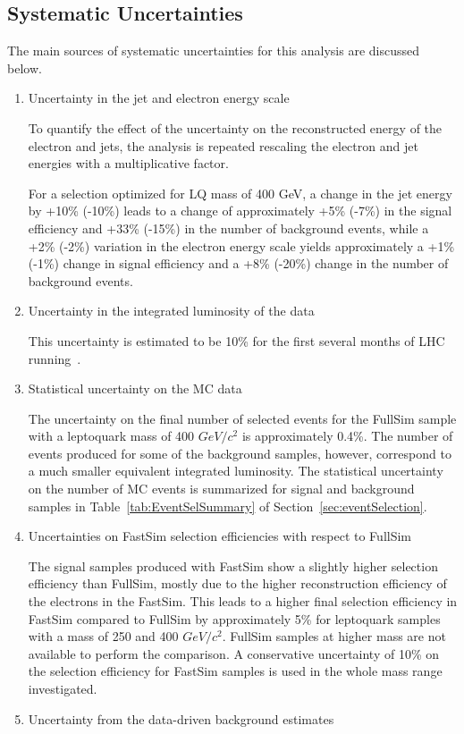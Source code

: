 \documentclass{cmspaper}
\begin{document}
\begin{linenumbers}
\section{Systematic Uncertainties} \label{sec:Systematics}

The main sources of systematic uncertainties for this analysis are discussed below.

%
\begin{enumerate}
\item Uncertainty in the jet and electron energy scale

To quantify the effect of the uncertainty on the reconstructed energy of the electron and jets,
the analysis is repeated rescaling the electron and jet energies
 with a multiplicative factor. 

For a selection optimized for LQ mass of 400 GeV, a change in the jet energy by +10\% (-10\%) leads 
to a change of approximately +5\% (-7\%) in the signal efficiency and +33\% (-15\%) in the number of background events, 
while a +2\% (-2\%) variation in the electron energy scale yields approximately a +1\% (-1\%) 
change in signal efficiency and a +8\% (-20\%) change in the number of background events. 

%
\item Uncertainty in the integrated luminosity of the data

This uncertainty is estimated to be 10\% for the first several months of LHC running~\cite{PTDR}. 
%
\item Statistical uncertainty on the MC data

The uncertainty on the final number of selected events for the FullSim sample with a leptoquark mass of 400 $GeV/c^2$ is 
approximately 0.4\%.  The number of events produced 
for some of the background samples, however, correspond to a much
smaller equivalent integrated luminosity.  
The statistical uncertainty on the number of MC events is summarized for signal and background samples 
in Table~\ref{tab:EventSelSummary} of Section~\ref{sec:eventSelection}.  
%
\item Uncertainties on FastSim selection efficiencies with respect to FullSim

The signal samples produced with FastSim show a slightly higher selection efficiency than FullSim, 
mostly due to the higher reconstruction efficiency of the electrons in the FastSim. 
This leads to a higher final selection efficiency in FastSim compared to FullSim by approximately 5\% 
for leptoquark samples with a mass of 250 and 400 $GeV/c^2$. FullSim samples at higher mass are not available 
to perform the comparison. A conservative uncertainty of 10\% on the selection efficiency 
for FastSim samples is used in the whole mass range investigated. 
%
\item Uncertainty from the data-driven background estimates


\end{enumerate}
\end{linenumbers}
\end{document}
